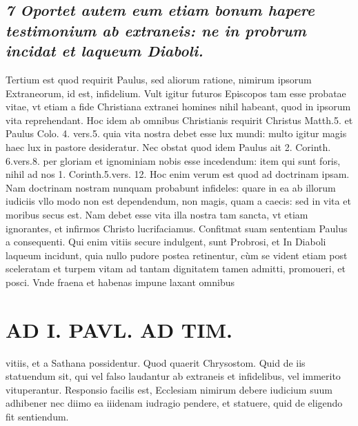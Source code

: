 \documentclass{article}
\begin{document}
\begin{pages}
\subsection*{\textit{7 Oportet autem eum etiam bonum hapere testimonium ab extraneis: ne in probrum incidat et laqueum Diaboli. }}\pstart Tertium est quod requirit Paulus, sed aliorum ratione, nimirum ipsorum Extraneorum, id est, infidelium. Vult igitur futuros Episcopos tam esse probatae vitae, vt etiam a fide Christiana extranei homines nihil habeant, quod in ipsorum vita reprehendant. Hoc idem ab omnibus Christianis requirit Christus Matth.5. et Paulus Colo. 4. vers.5. quia vita nostra debet esse lux mundi: multo igitur magis haec lux in pastore desideratur. Nec obstat quod idem Paulus ait 2. Corinth. 6.vers.8. per gloriam et ignominiam nobis esse incedendum: item qui sunt foris, nihil ad nos 1. Corinth.5.vers. 12. Hoc enim verum est quod ad doctrinam ipsam. Nam doctrinam nostram nunquam probabunt infideles: quare in ea ab illorum iudiciis vllo modo non est dependendum, non magis, quam a caecis: sed in vita et moribus secus est. Nam debet esse vita illa nostra tam sancta, vt etiam ignorantes, et infirmos Christo lucrifaciamus. Confitmat suam sententiam Paulus a consequenti. Qui enim vitiis secure indulgent, sunt Probrosi, et In Diaboli laqueum incidunt, quia nullo pudore postea retinentur, cùm se vident etiam post sceleratam et turpem vitam ad tantam dignitatem tamen admitti, promoueri, et posci. Vnde fraena et habenas impune laxant omnibus  \pend
\section*{AD I. PAVL. AD TIM. }
\marginpar{[ p.20.  ]}\pstart vitiis, et a Sathana possidentur. Quod quaerit Chrysostom. Quid de iis statuendum sit, qui vel falso laudantur ab extraneis et infidelibus, vel immerito vituperantur. Responsio facilis est, Ecclesiam nimirum debere iudicium suum adhibener nec diimo ea iiidenam iudragio pendere, et statuere, quid de eligendo fit sentiendum.  \pend
{}
{}

\end{pages}
\end{document}
